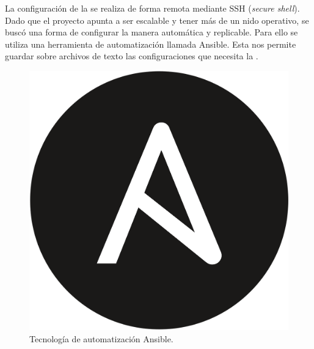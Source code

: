 La configuración de la \rspi se realiza de forma remota mediante SSH (\textit{secure shell}). Dado que el proyecto apunta a ser escalable y tener más de un nido operativo, se buscó una forma de configurar la \rpi manera automática y replicable. Para ello se utiliza una herramienta de automatización llamada Ansible. Esta nos permite guardar sobre archivos de texto las configuraciones que necesita la \rspi.

\begin{figure}[H]
	\centering
	\includegraphics[width=0.2\linewidth]{"../Ingenieria de Detalle/ImagenesIngenieria de Detalle/Ansible_logo"}
	\caption{Tecnología de automatización Ansible.}
	\label{fig:ansiblelogo}
\end{figure}














